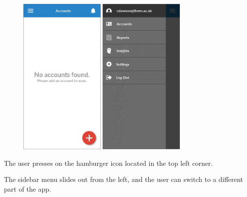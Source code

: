 \begin{figure}
  \subfigures
  \centering
  \begin{minipage}{4.6cm}
    \centering
    \includegraphics[width=4.2cm]{inc/ui_sb_step1.jpg}
    \caption{}
    \label{fig:ui_sb_step1}
  \end{minipage}
  \begin{minipage}{4.6cm}
    \centering
    \includegraphics[width=4.2cm]{inc/ui_sb_step2.jpg}
    \caption{}
    \label{fig:ui_sb_step2}
  \end{minipage}
\end{figure}

\begin{minipage}{\textwidth}
  \centering
  \begin{minipage}[t]{4.6cm}
    \vspace{0pt}
    \centering
    \begin{minipage}{4.4cm}
      The user presses on the hamburger icon located in the top left corner.
    \end{minipage}
  \end{minipage}
  \begin{minipage}[t]{4.6cm}
    \vspace{0pt}
    \centering
    \begin{minipage}{4.4cm}
      The sidebar menu slides out from the left, and the user can switch to a different part of the app.
    \end{minipage}
  \end{minipage}
\end{minipage}

